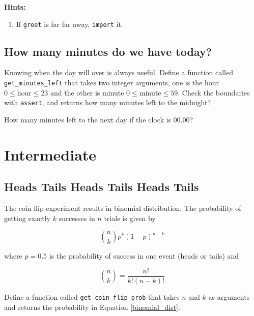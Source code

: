 \documentclass[a4paper]{article}
\begin{document}
\textbf{Hints:}
\begin{enumerate}
    \item If \texttt{greet} is far far away, \texttt{import} it.
\end{enumerate}

\subsection{How many minutes do we have today?}
Knowing when the day will over is always useful. Define a function called \texttt{get\_minutes\_left} that takes two integer arguments, one is the hour $0\leq \text{hour} \leq 23$ and the other is minute $0\leq \text{minute} \leq 59$. Check the boundaries with \texttt{assert}, and returns how many minutes left to the midnight?
\par
How many minutes left to the next day if the clock is 00.00?

\newpage
\section{Intermediate}
\subsection{Heads Tails Heads Tails Heads Tails}

The coin flip experiment results in binomial distribution. The probability of getting exactly $k$ successes in $n$ trials is given by 

\begin{equation}
	{n\choose k}p^k(1 - p)^{n - k}
	\label{binomial_dist}
\end{equation}

where $p=0.5$ is the probability of success in one event (heads or tails) and

\begin{equation}
	{n\choose k} = \frac{n!}{k!(n - k)!}
	\label{n choose k}
\end{equation}

Define a function called \texttt{get\_coin\_flip\_prob} that takes $n$ and $k$ as arguments and returns the probability in Equation \ref{binomial_dist}.
\end{document}
